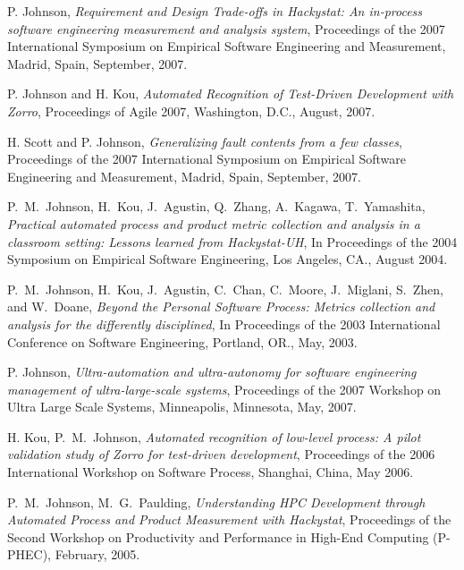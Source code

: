 \begin{Conference Publications}

\item P. Johnson, {\em Requirement and Design Trade-offs in Hackystat: An
in-process software engineering measurement and analysis system},
Proceedings of the 2007 International Symposium on Empirical Software
Engineering and Measurement, Madrid, Spain, September, 2007.

\item P. Johnson and H. Kou, {\em Automated Recognition of Test-Driven Development with Zorro}, 
Proceedings of Agile 2007, Washington, D.C., August, 2007. 

\item H. Scott and P. Johnson, {\em Generalizing fault contents from a few
classes}, Proceedings of the 2007 International Symposium on Empirical
Software Engineering and Measurement, Madrid, Spain, September, 2007.

\item P.~M.~Johnson, H.~Kou, J.~Agustin, Q.~Zhang, A.~Kagawa, T.~Yamashita,
{\em Practical automated process and product metric collection and analysis
in a classroom setting: {L}essons learned from {Hackystat-UH}}, In
Proceedings of the 2004 Symposium on Empirical Software Engineering, Los
Angeles, CA., August 2004.

\item P.~M.~Johnson, H.~Kou, J.~Agustin, C.~Chan, C.~Moore, 
J.~Miglani, S.~Zhen, and W.~Doane, {\em Beyond
the Personal Software Process: Metrics collection and analysis for the
differently disciplined}, In Proceedings of the 2003 International
Conference on Software Engineering, Portland, OR., May, 2003.


\end{Conference Publications}  


\begin{Workshop Publications}

\item P. Johnson, {\em Ultra-automation and ultra-autonomy for software
engineering management of ultra-large-scale systems}, Proceedings of the
2007 Workshop on Ultra Large Scale Systems, Minneapolis, Minnesota, May,
2007.

\item H. Kou, P.~M.~Johnson, 
{\em Automated recognition of low-level process: A pilot validation study
of Zorro for test-driven development}, Proceedings of the 2006 
International Workshop on Software Process, Shanghai, China, May 2006.

\item P.~M.~Johnson, M.~G.~Paulding, 
  {\em Understanding HPC Development through Automated Process and Product Measurement with Hackystat},
  Proceedings of the Second Workshop on Productivity and Performance in High-End Computing (P-PHEC), 
 February, 2005.


\end{Workshop Publications}



